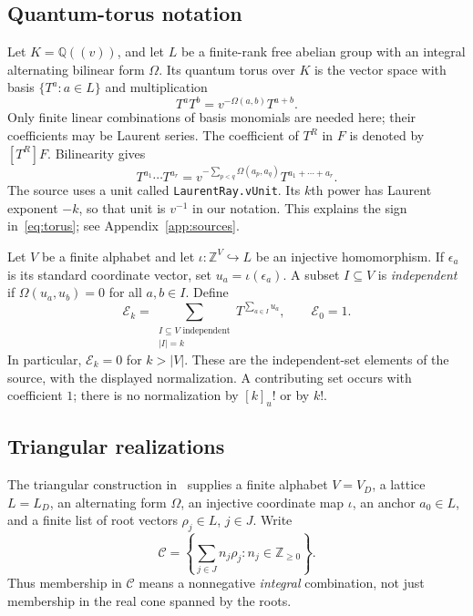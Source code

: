 \documentclass[11pt,reqno]{amsart}
\newcommand{\NN}{\mathbb Z_{\geq0}}
\newcommand{\ZZ}{\mathbb Z}
\newcommand{\QQ}{\mathbb Q}
\newcommand{\EE}{\mathscr E}
\newcommand{\CC}{\mathscr C}
\newcommand{\decl}[1]{\nolinkurl{#1}}
\theoremstyle{definition}
\theoremstyle{remark}
\numberwithin{equation}{section}
\begin{document}
\subsection{Quantum-torus notation}
Let $K=\QQ((v))$, and let $L$ be a finite-rank free abelian group with
an integral alternating bilinear form $\Omega$.  Its quantum torus over
$K$ is the vector space with basis $\{T^a:a\in L\}$ and multiplication
\begin{equation}\label{eq:torus}
 T^aT^b=v^{-\Omega(a,b)}T^{a+b}.
\end{equation}
Only finite linear combinations of basis monomials are needed here;
their coefficients may be Laurent series.  The coefficient of $T^R$
in $F$ is denoted by $[T^R]F$.  Bilinearity gives
\begin{equation}\label{eq:torus-product}
 T^{a_1}\cdots T^{a_r}
   =v^{-\sum_{p<q}\Omega(a_p,a_q)}T^{a_1+\cdots+a_r}.
\end{equation}
The source uses a unit called \decl{LaurentRay.vUnit}.  Its $k$th
power has Laurent exponent $-k$, so that unit is $v^{-1}$ in our
notation.  This explains the sign in~\eqref{eq:torus}; see
Appendix~\ref{app:sources}.

Let $V$ be a finite alphabet and let $\iota:\ZZ^V\hookrightarrow L$
be an injective homomorphism.  If $\epsilon_a$ is its standard coordinate
vector, set $u_a=\iota(\epsilon_a)$.  A subset $I\subseteq V$ is
\emph{independent} if $\Omega(u_a,u_b)=0$ for all $a,b\in I$.
Define
\begin{equation}\label{eq:independent}
 \EE_k=\sum_{\substack{I\subseteq V\text{ independent}\\|I|=k}}
       T^{\sum_{a\in I}u_a},\qquad \EE_0=1.
\end{equation}
In particular, $\EE_k=0$ for $k>|V|$.  These are the
independent-set elements of the source, with the displayed
normalization.  A contributing set occurs with coefficient $1$;
there is no normalization by $[k]_u!$ or by $k!$.

\subsection{Triangular realizations}
The triangular construction in~\cite{OpenAILean2026} supplies a finite
alphabet $V=V_D$, a lattice $L=L_D$, an alternating form $\Omega$, an
injective coordinate map $\iota$, an anchor $a_0\in L$, and a finite
list of root vectors $\rho_j\in L$, $j\in J$.  Write
\begin{equation}\label{eq:root-monoid}
 \CC=\left\{\sum_{j\in J}n_j\rho_j:n_j\in\NN\right\}.
\end{equation}
Thus membership in $\CC$ means a nonnegative \emph{integral}
combination, not just membership in the real cone spanned by the roots.
\end{document}
